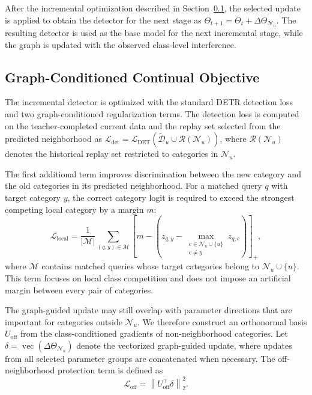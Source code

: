 After the incremental optimization described in
Section~\ref{sec:graph_conditioned_objective}, the selected update is applied
to obtain the detector for the next stage as
$\Theta_{t+1}=\Theta_t+\Delta\Theta_{\mathcal{N}_u}$.
The resulting detector is used as the base model for the next incremental
stage, while the graph is updated with the observed class-level interference.

\subsection{Graph-Conditioned Continual Objective}
\label{sec:graph_conditioned_objective}

The incremental detector is optimized with the standard DETR detection loss
and two graph-conditioned regularization terms. The detection loss is
computed on the teacher-completed current data and the replay set selected
from the predicted neighborhood as
$\mathcal{L}_{\mathrm{det}}
=\mathcal{L}_{\mathrm{DET}}(\widetilde{\mathcal{D}}_u
\cup\mathcal{R}(\mathcal{N}_u))$,
where $\mathcal{R}(\mathcal{N}_u)$ denotes the historical replay set restricted
to categories in $\mathcal{N}_u$.

The first additional term improves discrimination between the new category and
the old categories in its predicted neighborhood. For a matched query $q$
with target category $y$, the correct category logit is required to exceed the
strongest competing local category by a margin $m$:
\begin{equation}
\mathcal{L}_{\mathrm{local}}
=\frac{1}{|\mathcal{M}|}
\sum_{(q,y)\in\mathcal{M}}
\left[m-\left(z_{q,y}
-\max_{\substack{c\in\mathcal{N}_u\cup\{u\}\\c\neq y}}
z_{q,c}\right)\right]_{+},
\label{eq:local_margin}
\end{equation}
where $\mathcal{M}$ contains matched queries whose target categories belong to
$\mathcal{N}_u\cup\{u\}$. This term focuses on local class competition and
does not impose an artificial margin between every pair of categories.

The graph-guided update may still overlap with parameter directions that are
important for categories outside $\mathcal{N}_u$. We therefore construct an
orthonormal basis $U_{\mathrm{off}}$ from the class-conditioned gradients of
non-neighborhood categories. Let
$\delta=\operatorname{vec}(\Delta\Theta_{\mathcal{N}_u})$
denote the vectorized graph-guided update, where updates from all selected
parameter groups are concatenated when necessary. The off-neighborhood
protection term is defined as
\begin{equation}
\mathcal{L}_{\mathrm{off}}
=\left\|U_{\mathrm{off}}^{\top}\delta\right\|_2^2.
\label{eq:off_neighborhood}
\end{equation}

